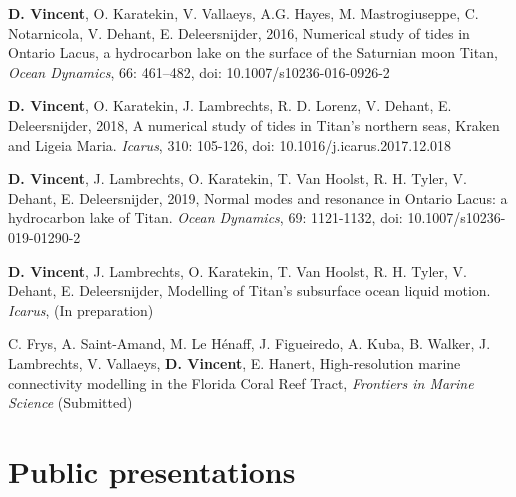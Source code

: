 \begin{list}{}{%
\setlength{\topsep}{0pt}%
\setlength{\leftmargin}{0.23in}%
\setlength{\listparindent}{-0.23in}%
\setlength{\itemindent}{-0.23in}%
\setlength{\parsep}{\parskip}%
}%


\item \textbf{D. Vincent}, O. Karatekin, V. Vallaeys, A.G. Hayes, M. Mastrogiuseppe, C. Notarnicola, V. Dehant, E. Deleersnijder, 2016, Numerical study of tides in Ontario Lacus, a hydrocarbon lake on the surface of the Saturnian moon Titan, \textit{Ocean Dynamics}, 66: 461--482, doi: 10.1007/s10236-016-0926-2

\item \textbf{D. Vincent}, O. Karatekin, J. Lambrechts, R. D. Lorenz, V. Dehant, E. Deleersnijder, 2018, A numerical study of tides in Titan's northern seas, Kraken and Ligeia Maria. \textit{Icarus}, 310: 105-126, doi: 10.1016/j.icarus.2017.12.018


\item \textbf{D. Vincent}, J. Lambrechts, O. Karatekin, T. Van Hoolst, R. H. Tyler, V. Dehant, E. Deleersnijder, 2019, Normal modes and resonance in Ontario Lacus: a hydrocarbon lake of Titan. \textit{Ocean Dynamics}, 69: 1121-1132, doi: 10.1007/s10236-019-01290-2

\item \textbf{D. Vincent}, J. Lambrechts, O. Karatekin, T. Van Hoolst, R. H. Tyler, V. Dehant, E. Deleersnijder, Modelling of Titan's subsurface ocean liquid motion. \textit{Icarus}, (In preparation)


\item C. Frys, A. Saint-Amand, M. Le Hénaff, J. Figueiredo, A. Kuba, B. Walker, J. Lambrechts, V. Vallaeys, \textbf{D. Vincent}, E. Hanert, High-resolution marine connectivity modelling in the Florida Coral Reef Tract, \textit{Frontiers in Marine Science} (Submitted)
\end{list}

\section*{Public presentations}


